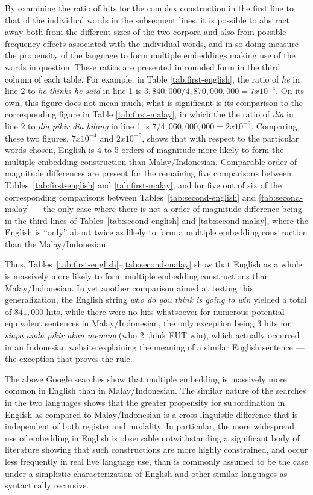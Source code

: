 \documentclass[output=paper,colorlinks,citecolor=brown
]{langscibook}
\begin{document}
By examining the ratio of hits for the complex construction in the first line to that of the individual words in the subsequent lines, it is possible to abstract away both from the different sizes of the two corpora and also from possible frequency effects associated with the individual words, and in so doing measure the propensity of the language to form multiple embeddings making use of the words in question.  These ratios are presented in rounded form in the third column of each table.  For example, in Table \ref{tab:first-english}, the ratio of \emph{he} in line 2 to \emph{he thinks he said} in line 1 is $3,840,000 / 4,870,000,000 = 7 x 10^{-4}$.  On its own, this figure does not mean much; what is significant is its comparison to the corresponding figure in Table \ref{tab:first-malay}, in which the the ratio of \emph{dia} in line 2 to \emph{dia pikir dia bilang} in line 1 is $7 / 4,060,000,000 = 2 x 10^{-9}$.  Comparing these two figures, $7 x 10^{-4}$ and $2 x 10^{-9}$, shows that with respect to the particular words chosen, English is 4 to 5 orders of magnitude more likely to form the multiple embedding construction than Malay/Indonesian.  Comparable order-of-magnitude differences are present for the remaining five comparisons between Tables~\ref{tab:first-english} and \ref{tab:first-malay}, and for five out of six of the corresponding comparisons between Tables~\ref{tab:second-english} and \ref{tab:second-malay} — the only case where there is not a order-of-magnitude difference being in the third lines of Tables~\ref{tab:second-english} and \ref{tab:second-malay}, where the English is ``only'' about twice as likely to form a multiple embedding construction than the Malay/Indonesian.

Thus, Tables~\ref{tab:first-english}--\ref{tab:second-malay} show that English as a whole is massively more likely to form multiple embedding constructions than Malay/Indonesian.  In yet another comparison aimed at testing this generalization, the English string \emph{who do you think is going to win} yielded a total of $841,000$ hits, while there were no hits whatsoever for numerous potential equivalent sentences in Malay/Indonesian, the only exception being 3 hits for \emph{siapa anda pikir akan menang} (who 2 think FUT win), which actually occurred in an Indonesian website explaining the meaning of a similar English sentence — the exception that proves the rule.

The above Google searches show that multiple embedding is massively more common in English than in Malay/Indonesian.  The similar nature of the searches in the two languages shows that the greater propensity for subordination in English as compared to Malay/Indonesian is  a cross-linguistic difference that is independent of both register and modality.  In particular, the more widespread use of embedding in English is observable notwithstanding a significant body of literature \citep{karlsson2007aconstraints,karlsson2007bconstraints,karlsson2009aorigin,karlsson2009bsyntactic} showing that such constructions are more highly constrained, and occur less frequently in real live language use, than is commonly assumed to be the case under a simplistic characterization of English and other similar languages as syntactically recursive.
\end{document}
